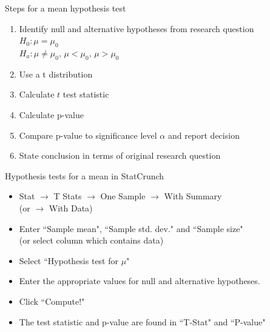 \documentclass[xcolor=table]{beamer}
\begin{document}
\begin{frame}{Steps for a mean hypothesis test}
\begin{block}{}
\large
\begin{enumerate}
\item Identify null and alternative hypotheses from research question\\
$H_0: \mu = \mu_0$\\
$H_a: \mu \ne \mu_0, \, \mu < \mu_0, \, \mu> \mu_0$
\item Use a t distribution
\item Calculate $t$ test statistic
\item Calculate p-value
\item Compare p-value to significance level $\alpha$ and report decision
\item State conclusion in terms of original research question
\end{enumerate}
\end{block}
\end{frame}

\begin{frame}{Hypothesis tests for a mean in StatCrunch}

\begin{block}{}
\large
\begin{itemize}
\item Stat $\to$ T Stats $\to$ One Sample $\to$ With Summary\\ (or $\to$ With Data)
\item Enter ``Sample mean", ``Sample std. dev." and ``Sample size"\\
(or select column which contains data)
\item Select ``Hypothesis test for $\mu$"
\item Enter the appropriate values for null and alternative hypotheses.
\item Click ``Compute!"
\item The test statistic and p-value are found in ``T-Stat" and ``P-value"
\end{itemize}
\end{block}

\end{frame}
\end{document}
